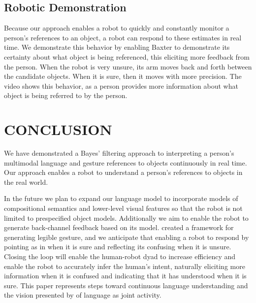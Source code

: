 \documentclass[letterpaper, 10 pt, conference]{ieeeconf}
\begin{document}
\subsection{Robotic Demonstration}

Because our approach enables a robot to quickly and constantly monitor
a person's references to an object, a robot can respond to these
estimates in real time.  We demonstrate this behavior by enabling
Baxter to demonstrate its certainty about what object is being
referenced, this eliciting more feedback from the person.  When the
robot is very unsure, its arm moves back and forth between the
candidate objects.  When it is sure, then it moves with more
precision.  The video shows this behavior, as a person provides more
information about what object is being referred to by the person.

\section{CONCLUSION}

We have demonstrated a Bayes' filtering approach to interpreting a
person's multimodal language and gesture references to objects
continuously in real time.  Our approach enables a robot to understand
a person's references to objects in the real world.

In the future we plan to expand our language model to incorporate
models of compositional semantics and lower-level visual features so
that the robot is not limited to prespecified object models.
Additionally we aim to enable the robot to generate back-channel
feedback based on its model.  \citet{dragan13} created a framework for
generating legible gesture, and we anticipate that enabling a robot to
respond by pointing as in \citet{holladay14} when it is sure and
reflecting its confusing when it is unsure.  Closing the loop will
enable the human-robot dyad to increase efficiency and enable the
robot to accurately infer the human's intent, naturally eliciting more
information when it is confused and indicating that it has understood
when it is sure.  This paper represents steps toward continuous
language understanding and the vision presented by \citet{clark96} of
language as joint activity.




\end{document}
